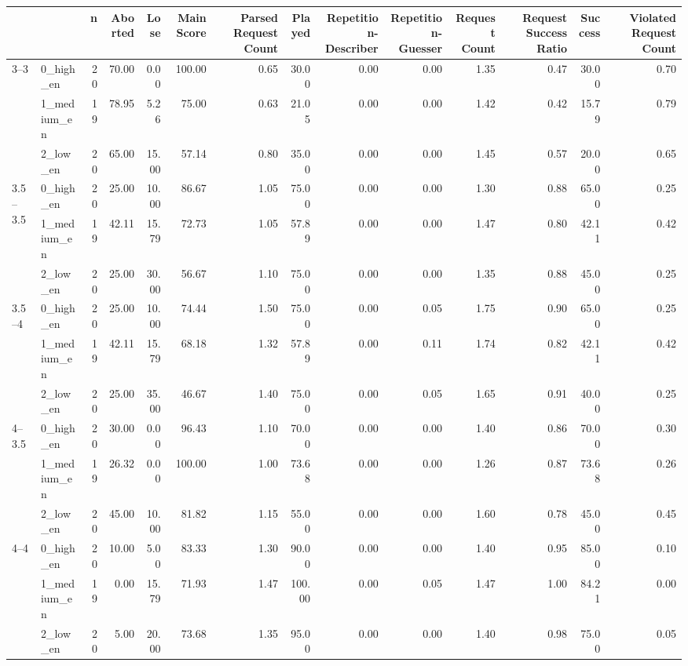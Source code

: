 \begin{tabular}{llrrrrrrrrrrrr}
\toprule
 &  & n & Aborted & Lose & Main Score & Parsed Request Count & Played & Repetition-Describer & Repetition-Guesser & Request Count & Request Success Ratio & Success & Violated Request Count \\
\midrule
\multirow[t]{3}{*}{3--3} & 0_high_en & 20 & 70.00 & 0.00 & 100.00 & 0.65 & 30.00 & 0.00 & 0.00 & 1.35 & 0.47 & 30.00 & 0.70 \\
 & 1_medium_en & 19 & 78.95 & 5.26 & 75.00 & 0.63 & 21.05 & 0.00 & 0.00 & 1.42 & 0.42 & 15.79 & 0.79 \\
 & 2_low_en & 20 & 65.00 & 15.00 & 57.14 & 0.80 & 35.00 & 0.00 & 0.00 & 1.45 & 0.57 & 20.00 & 0.65 \\
\cline{1-14}
\multirow[t]{3}{*}{3.5--3.5} & 0_high_en & 20 & 25.00 & 10.00 & 86.67 & 1.05 & 75.00 & 0.00 & 0.00 & 1.30 & 0.88 & 65.00 & 0.25 \\
 & 1_medium_en & 19 & 42.11 & 15.79 & 72.73 & 1.05 & 57.89 & 0.00 & 0.00 & 1.47 & 0.80 & 42.11 & 0.42 \\
 & 2_low_en & 20 & 25.00 & 30.00 & 56.67 & 1.10 & 75.00 & 0.00 & 0.00 & 1.35 & 0.88 & 45.00 & 0.25 \\
\cline{1-14}
\multirow[t]{3}{*}{3.5--4} & 0_high_en & 20 & 25.00 & 10.00 & 74.44 & 1.50 & 75.00 & 0.00 & 0.05 & 1.75 & 0.90 & 65.00 & 0.25 \\
 & 1_medium_en & 19 & 42.11 & 15.79 & 68.18 & 1.32 & 57.89 & 0.00 & 0.11 & 1.74 & 0.82 & 42.11 & 0.42 \\
 & 2_low_en & 20 & 25.00 & 35.00 & 46.67 & 1.40 & 75.00 & 0.00 & 0.05 & 1.65 & 0.91 & 40.00 & 0.25 \\
\cline{1-14}
\multirow[t]{3}{*}{4--3.5} & 0_high_en & 20 & 30.00 & 0.00 & 96.43 & 1.10 & 70.00 & 0.00 & 0.00 & 1.40 & 0.86 & 70.00 & 0.30 \\
 & 1_medium_en & 19 & 26.32 & 0.00 & 100.00 & 1.00 & 73.68 & 0.00 & 0.00 & 1.26 & 0.87 & 73.68 & 0.26 \\
 & 2_low_en & 20 & 45.00 & 10.00 & 81.82 & 1.15 & 55.00 & 0.00 & 0.00 & 1.60 & 0.78 & 45.00 & 0.45 \\
\cline{1-14}
\multirow[t]{3}{*}{4--4} & 0_high_en & 20 & 10.00 & 5.00 & 83.33 & 1.30 & 90.00 & 0.00 & 0.00 & 1.40 & 0.95 & 85.00 & 0.10 \\
 & 1_medium_en & 19 & 0.00 & 15.79 & 71.93 & 1.47 & 100.00 & 0.00 & 0.05 & 1.47 & 1.00 & 84.21 & 0.00 \\
 & 2_low_en & 20 & 5.00 & 20.00 & 73.68 & 1.35 & 95.00 & 0.00 & 0.00 & 1.40 & 0.98 & 75.00 & 0.05 \\

\end{tabular}
